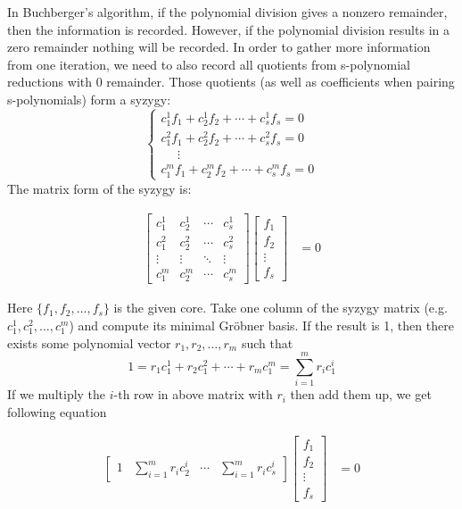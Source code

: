  In Buchberger's algorithm, if the polynomial division
 gives a nonzero remainder, then the information is 
 recorded. However, if the polynomial division results
 in a zero remainder nothing will be recorded. In order
 to gather more information from one iteration, we
 need to also record all quotients from s-polynomial
 reductions with 0 remainder. Those quotients (as well 
 as coefficients when pairing s-polynomials) form
 a syzygy:
\[
 \begin{cases}
 c_1^1f_1+c_2^1f_2+\cdots+c_s^1f_s = 0\\
 c_1^2f_1+c_2^2f_2+\cdots+c_s^2f_s  = 0\\
 \ \ \ \ \ \  \vdots \\
 c_1^mf_1+c_2^mf_2+\cdots+c_s^mf_s = 0  
 \end{cases}
\]
The matrix form of the syzygy is:
\begin{center}
\begin{align}
\label{mat:syzygy}
   \begin{bmatrix}
           c_1^1 & c_2^1 & \cdots & c_s^1 \\
           c_1^2 & c_2^2 & \cdots & c_s^2 \\
           \vdots & \vdots & \ddots & \vdots \\
           c_1^m & c_2^m & \cdots & c_s^m
         \end{bmatrix}
    \begin{bmatrix}
           f_{1} \\
           f_{2} \\
           \vdots \\
           f_{s}
         \end{bmatrix}
         &= 0
  \end{align}

\end{center}
 Here $\{f_1,f_2,\dots,f_s\}$ is the given core.
 Take one column of the syzygy matrix (e.g. $c_1^1, c_1^2, \dots, c_1^m$)
 and compute its minimal Gr\"obner basis. If the result is 1, then there exists some polynomial vector
 $r_1,r_2,\dots,r_m$ such that
 $$1 = r_1c_1^1 + r_2c_1^2 + \cdots + r_mc_1^m = \sum_{i=1}^m r_ic_1^i$$
 If we multiply the $i$-th row in above matrix with $r_i$ then add them up, 
 we get following equation
 \begin{center}
\begin{align}
   \begin{bmatrix}
           1 & \sum_{i=1}^m r_ic_2^i & \cdots & \sum_{i=1}^m r_ic_s^i
         \end{bmatrix}
    \begin{bmatrix}
           f_{1} \\
           f_{2} \\
           \vdots \\
           f_{s}
         \end{bmatrix}
         &= 0
  \end{align}

\end{center}
